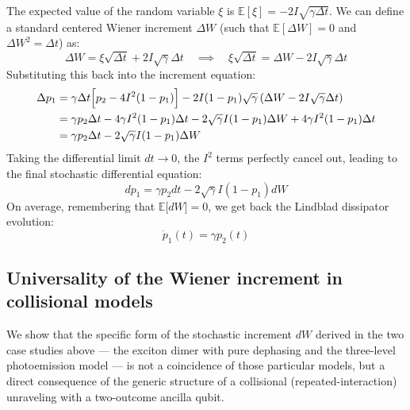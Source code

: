 \documentclass[a4paper,12pt]{article}
\begin{document}
The expected value of the random variable $\xi$ is $\mathbb{E}[\xi] = -2I\sqrt{\gamma\Delta t}$. We can define a standard centered Wiener increment $\Delta W$ (such that $\mathbb{E}[\Delta W] = 0$ and $\Delta W^2 = \Delta t$) as:
\begin{equation}
	\Delta W = \xi \sqrt{\Delta t} + 2I\sqrt{\gamma}\Delta t \quad \implies \quad \xi \sqrt{\Delta t} = \Delta W - 2I\sqrt{\gamma}\Delta t
\end{equation}
Substituting this back into the increment equation:
\begin{align}
	\Delta p_1 &= \gamma \Delta t \Big[ p_2 - 4I^2(1 - p_1) \Big] - 2I (1 - p_1) \sqrt{\gamma} \left( \Delta W - 2I\sqrt{\gamma}\Delta t \right) \notag \\
	&= \gamma p_2 \Delta t - 4\gamma I^2 (1 - p_1) \Delta t - 2\sqrt{\gamma} I (1 - p_1) \Delta W + 4\gamma I^2 (1 - p_1) \Delta t \notag \\
	&= \gamma p_2 \Delta t - 2\sqrt{\gamma} I (1 - p_1) \Delta W
\end{align}
Taking the differential limit $dt \to 0$, the $I^2$ terms perfectly cancel out, leading to the final stochastic differential equation:
\begin{equation}
	dp_1 = \gamma p_2 dt - 2\sqrt{\gamma} I (1 - p_1) dW
\end{equation}
On average, remembering that $ \mathbb{E}\big[dW\big] = 0 $, we get back the Lindblad dissipator evolution: 
\begin{equation}
	\dot{p}_{1} (t) = \gamma p_{2} (t)
\end{equation}


\newpage

\subsection{Universality of the Wiener increment in collisional models}
\label{sub:universal_wiener}

We show that the specific form of the stochastic increment $dW$ derived in the two case studies above — the exciton dimer with pure dephasing and the three-level photoemission model — is not a coincidence of those particular models, but a direct consequence of the generic structure of a collisional (repeated-interaction) unraveling with a two-outcome ancilla qubit.
\end{document}
